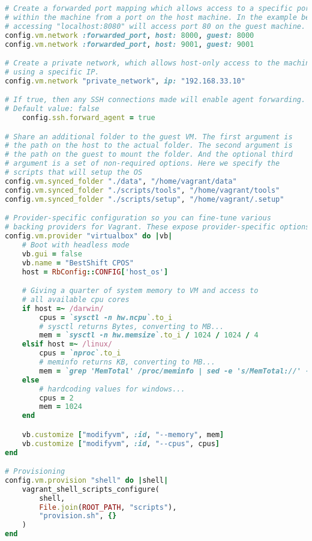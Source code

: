 \begin{lstlisting}[language=Ruby, caption=Vagrantfile]
# Create a forwarded port mapping which allows access to a specific port
# within the machine from a port on the host machine. In the example below,
# accessing "localhost:8080" will access port 80 on the guest machine.
config.vm.network :forwarded_port, host: 8000, guest: 8000
config.vm.network :forwarded_port, host: 9001, guest: 9001

# Create a private network, which allows host-only access to the machine
# using a specific IP.
config.vm.network "private_network", ip: "192.168.33.10"

# If true, then any SSH connections made will enable agent forwarding.
# Default value: false
	config.ssh.forward_agent = true

# Share an additional folder to the guest VM. The first argument is
# the path on the host to the actual folder. The second argument is
# the path on the guest to mount the folder. And the optional third
# argument is a set of non-required options. Here we specify the 
# scripts that will setup the OS
config.vm.synced_folder "./data", "/home/vagrant/data"
config.vm.synced_folder "./scripts/tools", "/home/vagrant/tools"
config.vm.synced_folder "./scripts/setup", "/home/vagrant/.setup"

# Provider-specific configuration so you can fine-tune various
# backing providers for Vagrant. These expose provider-specific options.
config.vm.provider "virtualbox" do |vb|
	# Boot with headless mode
	vb.gui = false
	vb.name = "BestShift CPOS"
	host = RbConfig::CONFIG['host_os']

	# Giving a quarter of system memory to VM and access to 
	# all available cpu cores
	if host =~ /darwin/
		cpus = `sysctl -n hw.ncpu`.to_i
		# sysctl returns Bytes, converting to MB...
		mem = `sysctl -n hw.memsize`.to_i / 1024 / 1024 / 4
	elsif host =~ /linux/
		cpus = `nproc`.to_i
		# meminfo returns KB, converting to MB...
		mem = `grep 'MemTotal' /proc/meminfo | sed -e 's/MemTotal://' -e 's/ kB//'`.to_i / 1024 / 4
	else
		# hardcoding values for windows...
		cpus = 2
		mem = 1024
	end

	vb.customize ["modifyvm", :id, "--memory", mem]
	vb.customize ["modifyvm", :id, "--cpus", cpus]
end

# Provisioning
config.vm.provision "shell" do |shell|
	vagrant_shell_scripts_configure(
		shell,
		File.join(ROOT_PATH, "scripts"),
		"provision.sh",	{}
	)
end
\end{lstlisting}

